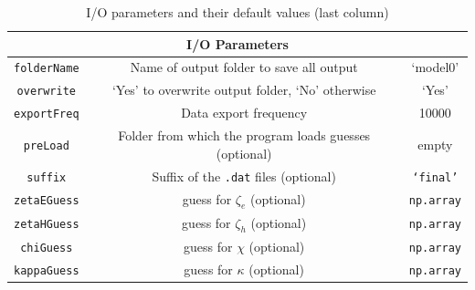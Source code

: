 \documentclass[12pt]{article}
\begin{document}
\begin{table}
\centering
            \caption{I/O parameters and their default values (last column)}\label{table:ioParams}
            \begin{tabular}{|c|c|c|}
            \hline
                \multicolumn{3}{|c|}{\textbf{I/O Parameters}} \\
                \hline
                \texttt{folderName} & Name of output folder to save all output & `model0' \\ \hline
                \texttt{overwrite} & `Yes' to overwrite output folder, `No' otherwise & `Yes' \\ \hline
                \texttt{exportFreq} & Data export frequency & 10000\\ \hline                
                \texttt{preLoad} & Folder from which the program loads guesses (optional) & empty\\ \hline
                \texttt{suffix} & Suffix of the \texttt{.dat} files (optional) & \texttt{`final'}\\ \hline
                \texttt{zetaEGuess} & guess for $\zeta_e$ (optional) & \texttt{np.array}  \\ \hline
                \texttt{zetaHGuess} & guess for $\zeta_h$ (optional) &  \texttt{np.array} \\ \hline
                \texttt{chiGuess} & guess for $\chi$ (optional) &  \texttt{np.array} \\ \hline
                \texttt{kappaGuess} & guess for $\kappa$ (optional) &  \texttt{np.array}  \\ \hline
                \end{tabular}
\end{table}
\end{document}
